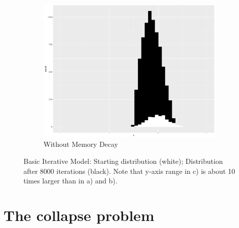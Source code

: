 \begin{figure}[H]
\begin{subfigure}[t]{.3\textwidth}
        \includegraphics[width=\linewidth]{figures/8000iternomemory.pdf}
        \caption{\label{fig:No-memory-decay:}Without Memory Decay}
    \end{subfigure}
\caption{\label{fig:First Model param}Basic Iterative Model: Starting distribution
(white); Distribution after 8000 iterations (black). Note that y-axis
range in c) is about 10 times larger than in a) and b).}
\end{figure}


\section{\label{sec:Iterativity}The collapse problem}

